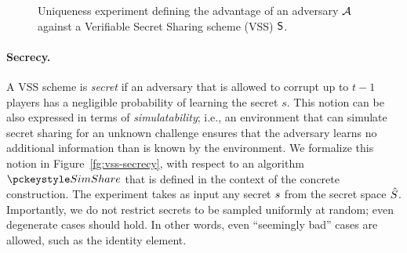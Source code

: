 \begin{figure}[!ht]
  \begin{pchstack}[boxed,center,space=1em]
  \begin{pcvstack}
  \end{pcvstack}
  \end{pchstack}

  \caption{Uniqueness experiment defining the advantage of an adversary $\mathcal{A}$ against a Verifiable Secret Sharing scheme (VSS) $\mathsf{S}$.
  }
\label{fg:vss-unique}
\end{figure}



\paragraph{Secrecy.}
A VSS scheme is \emph{secret} if an adversary that is allowed to corrupt up to $t-1$ players has a negligible probability of learning the secret $s$.
This notion can be also expressed in terms of \emph{simulatability};
i.e., an environment that can simulate secret sharing for an unknown challenge ensures that the adversary learns no additional information than is known by the environment.
We formalize this notion in Figure~\ref{fg:vss-secrecy},
with respect to an algorithm $\simshare$ that is defined in the context of the concrete construction.
The experiment takes as input any secret $s$ from the secret space
$\hat{S}$.
Importantly, we do not restrict secrets to be sampled uniformly at random;
even degenerate cases should hold.
In other words,
even ``seemingly bad'' cases are allowed,
such as the identity element.


